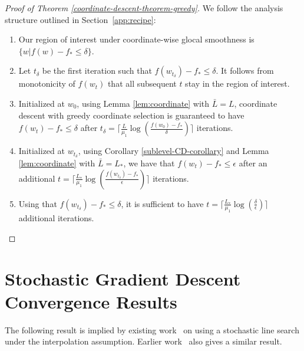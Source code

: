 \documentclass[10pt]{article} %
\begin{document}
\begin{proof}[Proof of Theorem \ref{coordinate-descent-theorem-greedy}]
We follow the analysis structure outlined in Section~\ref{app:recipe}:
\begin{enumerate}
\item Our region of interest under coordinate-wise glocal smoothness is $\{ w \vert f(w) - f_* \leq \delta \}$.
\item Let $t_\delta$ be the first iteration such that $f(w_{t_\delta}) - f_* \leq \delta$. It follows from monotonicity of $f(w_t)$ that all subsequent $t$ stay in the region of interest.
\item Initialized at $w_0$, using Lemma \ref{lem:coordinate} with $\bar{L} = L$, coordinate descent with greedy coordinate selection is guaranteed to have $f(w_t) - f_{*} \leq \delta$ after $t_\delta = \lceil \frac{L}{\mu_1}\log\left(\frac{f(w_0) - f_*}{\delta}\right) \rceil$ iterations.
\item Initialized at $w_{t_\delta}$, using Corollary \ref{sublevel-CD-corollary} and Lemma \ref{lem:coordinate} with $\bar{L} = L_{*}$, we have that $f(w_t) - f_{*} \leq \epsilon$ after an additional $t = \lceil \frac{L_{*}}{\mu_1}\log\left(\frac{f(w_{t_\delta}) - f_*}{\epsilon}\right) \rceil$ iterations.
\item Using that $f(w_{t_\delta}) - f_* \leq \delta$, it is sufficient to have $t = \lceil \frac{L_{*}}{\mu_1}\log\left(\frac{\delta}{\epsilon}\right) \rceil$ additional iterations.
\end{enumerate}
\end{proof}


\section{Stochastic Gradient Descent Convergence Results}\label{stochastic-proof}
\newcommand{\calL}{\mathcal{L}}
\newcommand{\wstar}{w_{*}}

The following result is implied by existing work~\cite[Theorem~9]{mishkin2020interpolation} on using a stochastic line search under the interpolation assumption. Earlier work~\cite[Theorem~1]{sls} also gives a similar result.
\end{document}
